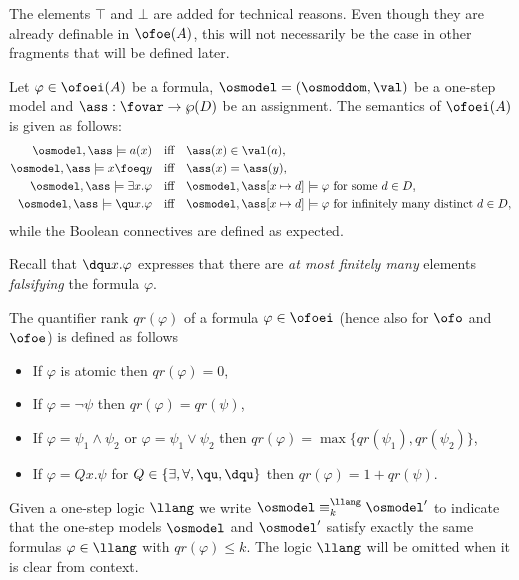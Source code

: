 \begin{remark}
	The elements $\top$ and $\bot$ are added for technical reasons. Even though they are already definable in $\ofoe(A)$, this will not necessarily be the case in other fragments that will be defined later.
\end{remark}


\begin{definition}
	Let $\varphi \in \ofoei(A)$ be a formula, $\osmodel = (\osmoddom,\val)$ be a one-step model and $\ass:\fovar\to \wp(D)$ be an assignment. The semantics of $\ofoei(A)$ is given as follows:
	\begin{align*}
	    \osmodel,\ass \models a(x) & \quad\text{iff}\quad \ass(x) \in \val(a),\\
	    \osmodel,\ass \models x \foeq y & \quad\text{iff}\quad \ass(x) = \ass(y),\\
	    \osmodel,\ass \models \exists x.\varphi & \quad\text{iff}\quad \osmodel,\ass[x\mapsto d] \models \varphi \text{ for some $d\in D$},\\
	    \osmodel,\ass \models \qu x.\varphi & \quad\text{iff}\quad \osmodel,\ass[x\mapsto d] \models \varphi \text{ for infinitely many distinct $d\in D$},
	\end{align*}
	while the Boolean connectives are defined as expected.
\end{definition}

Recall that $\dqu x.\varphi$ expresses that there are \emph{at most finitely many} elements \emph{falsifying} the formula $\varphi$.

\begin{definition}
The quantifier rank $qr(\varphi)$ of a formula $\varphi \in \ofoei$ (hence also for $\ofo$ and $\ofoe$) is defined as follows
%
\begin{itemize}
	 pt
	\item If $\varphi$ is atomic then $qr(\varphi) = 0$,
	\item If $\varphi = \lnot\psi$ then $qr(\varphi) = qr(\psi)$,
	\item If $\varphi = \psi_1 \land \psi_2$ or $\varphi = \psi_1 \lor \psi_2$ then $qr(\varphi) = \max\{qr(\psi_1),qr(\psi_2)\}$,
	\item If $\varphi = Qx.\psi$ for $Q \in \{\exists,\forall,\qu,\dqu\}$ then $qr(\varphi) = 1+qr(\psi)$.
\end{itemize}
%
Given a one-step logic $\llang$ we write $\osmodel \equiv_k^{\llang} \osmodel'$ to indicate that the one-step models $\osmodel$ and $\osmodel'$ satisfy exactly the same formulas $\varphi \in \llang$ with $qr(\varphi) \leq k$. The logic $\llang$ will be omitted when it is clear from context.
\end{definition}

